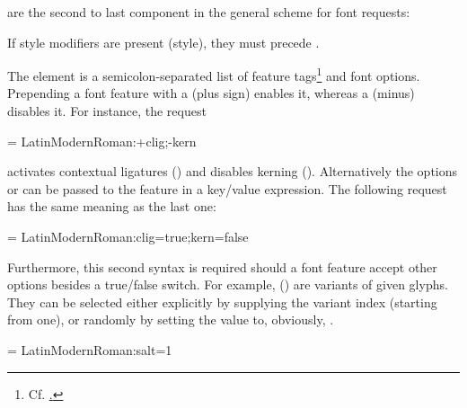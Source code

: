 \endsubsubsection
\endsubsection
\endsection


 are the second to last component in the
general scheme for font requests:

\beginnarrower
  \nonproportional{:}%
  \nonproportional{:}%
\endnarrower

\noindent
If style modifiers are present (\XETEX style), they must precede
.

The element  is a semicolon-separated list of feature
tags\footnote{%
  Cf. \hyperlink {http://www.microsoft.com/typography/otspec/featurelist.htm}.
}
and font options.
%
Prepending a font feature with a \inlinecode{+} (plus sign) enables it,
whereas a \inlinecode{-} (minus) disables it. For instance, the request

\beginlisting
  \font \test = LatinModernRoman:+clig;-kern
\endlisting

\noindent activates contextual ligatures () and
disables kerning ().
%
Alternatively the options  or  can
be passed to the feature in a key/value expression.
%
The following request has the same meaning as the last one:

\beginlisting
  \font \test = LatinModernRoman:clig=true;kern=false
\endlisting

\noindent
Furthermore, this second syntax is required should a font feature
accept other options besides a true/false switch.
%
For example,  () are
variants of given glyphs.
%
They can be selected either explicitly by supplying the variant
index (starting from one), or randomly by setting the value to,
obviously, .

\beginlisting
  \font \librmsaltfirst = LatinModernRoman:salt=1
\endlisting

\label{sec:mode}

\begindescriptions

